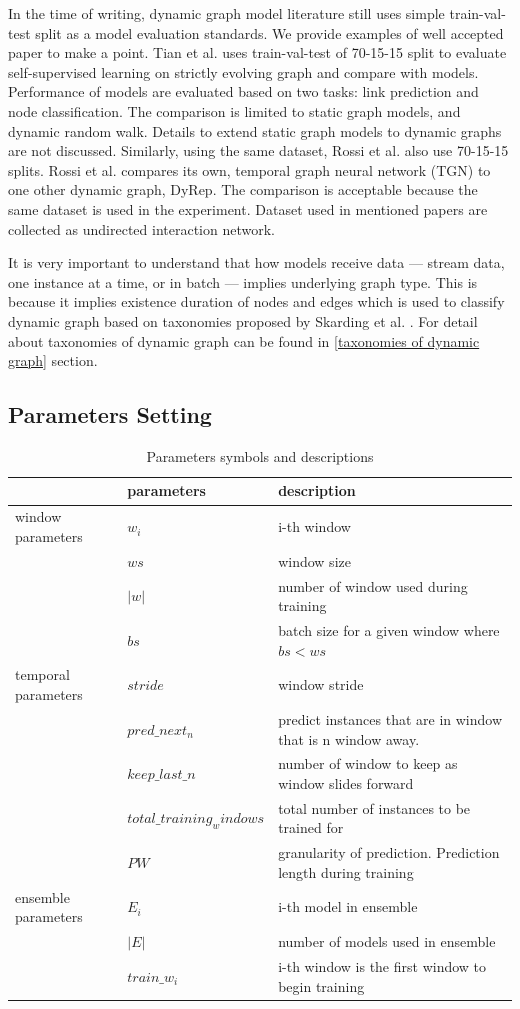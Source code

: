 \documentclass{IEEEtran}
\begin{document}
In the time of writing, dynamic graph model literature still uses simple train-val-test split as a model evaluation standards. We provide examples of well accepted paper to make a point. Tian et al. \cite{tian2021self} uses train-val-test of 70-15-15 split to evaluate self-supervised learning on strictly evolving graph and compare with models. Performance of models are evaluated based on two tasks: link prediction and node classification. The comparison is limited to static graph models, and dynamic random walk. Details to extend static graph models to dynamic graphs are not discussed. Similarly, using the same dataset, Rossi et al. \cite{rossi2020temporal} also use 70-15-15 splits. Rossi et al. compares its own, temporal graph neural network (TGN) to one other dynamic graph, DyRep. The comparison is acceptable because the same dataset is used in the experiment. Dataset used in mentioned papers are collected as undirected interaction network.

It is very important to understand that how models receive data --- stream data, one instance at a time, or in batch --- implies underlying graph type. This is because it implies existence duration of nodes and edges which is used to classify dynamic graph based on taxonomies proposed by Skarding et al. \cite{skardingFoundationsModelingDynamic2021}. For detail about taxonomies of dynamic graph can be found in \ref{taxonomies of dynamic graph} section.

\subsection{Parameters Setting}
\label{sec:org47cfd6c}
\begin{table}[htbp]
\caption{\label{parameters}Parameters symbols and descriptions}
\centering
\begin{tabular}{lll}
\hline
\hline
 & parameters & description\\
\hline
window parameters & \(w_i\) & i-th window\\
 & \(ws\) & window size\\
 & \(\vert w \vert\) & number of window used during training\\
 & \(bs\) & batch size for a given window where \(bs < ws\)\\
temporal parameters & \(stride\) & window stride\\
 & \(pred\_next_{n}\) & predict instances that are in window that is n window away.\\
 & \(keep\_last\_n\) & number of window to keep as window slides forward\\
 & \(total\_training_windows\) & total number of instances to be trained for\\
 & \(PW\) & granularity of prediction. Prediction length during training\\
ensemble parameters & \(E_i\) & i-th model in ensemble\\
 & \(\vert E \vert\) & number of models used in ensemble\\
 & \(train\_w_{i}\) & i-th window is the first window to begin training\\
\end{tabular}
\end{table}
\end{document}
